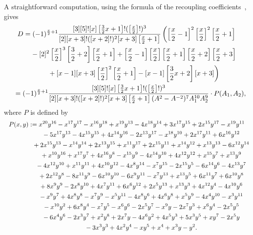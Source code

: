 \documentclass[11pt]{article}
\numberwithin{equation}{section}
\begin{document}
A straightforward computation, using the formula of the recoupling coefficients~\cite{MV}, gives
\begin{gather*}
D = (-1)^{\frac{x}{2}+1}\frac{[3][5]![x] \left[\frac{3}{2}x+1 \right]!(\left[\frac{x}{2}\right]!)^3}{[2][x+3]!([x+2]!)^2[x+3] \left[\frac{x}{2}+1\right]}
\left( \left[\frac{x}{2}-1\right]^2 \left[\frac{x}{2}\right]^2\left[\frac{x}{2}+1\right] \right.\\
\hphantom{D =}{} - [2]^2\left[\frac{x}{2}\right]^3\left[\frac{3}{2}+2\right] \left[\frac{x}{2}+1\right] + \left[\frac{x}{2}-1\right]\left[\frac{x}{2}\right] \left[\frac{x}{2}+1\right] \left[\frac{x}{2}+2\right] \left[\frac{x}{2}+3\right]\\
\left.\hphantom{D =}{} + [x-1][x+3] \left[\frac{x}{2}\right]^2\left[\frac{x}{2}+1\right] - [x-1]\left[\frac{3}{2}x+2\right][x+3] \right) \\
\hphantom{D}{} = (-1)^{\frac{x}{2}+1}\frac{[3][5]![x]\left[\frac{3}{2}x+1\right]!(\left[\frac{x}{2}\right]!)^3}{[2][x+3]!([x+2]!)^2[x+3]\left[\frac{x}{2}+1\right](A^2-A^{-2})^7A_1^{10}A_2^{9}}\cdot P(A_1,A_2),
\end{gather*}
where $P$ is defined by
\begin{gather*}
P(x,y):= x^{20}y^{16}-x^{17}y^{17}-x^{16}y^{18}+x^{19}y^{13}-4x^{18}y^{14}+3x^{17}y^{15}+2x^{15}y^{17}-x^{19}y^{11}\\
\hphantom{P(x,y):=}{} -5x^{17}y^{13}-4x^{15}y^{15}+4x^{14}y^{16}-2x^{13}y^{17}-x^{18}y^{10} +2x^{17}y^{11}+6x^{16}y^{12} \\
\hphantom{P(x,y):=}{}+2x^{15}y^{13}-x^{14}y^{14}+2x^{13}y^{15}+x^{11}y^{17}+2x^{15}y^{11} +x^{14}y^{12}+x^{13}y^{13}-6x^{12}y^{14} \\
\hphantom{P(x,y):=}{}+x^{10}y^{16}+x^{17}y^7+4x^{16}y^8-x^{15}y^9-4x^{14}y^{10}+4x^{12}y^{12}+x^{15}y^7+x^{13}y^9 \\
\hphantom{P(x,y):=}{}-4x^{12}y^{10}+x^{11}y^{11}+4x^{10}y^{12}-4x^8y^{14}-x^7y^{15}-2x^{15}y^5-6x^{14}y^6-4x^{13}y^7 \\
\hphantom{P(x,y):=}{}+2x^{12}y^8 -8x^{11}y^9-6x^{10}y^{10}-6x^9y^{11}-x^7y^{13} +x^{13}y^5+6x^{11}y^7+6x^{10}y^8 \\
\hphantom{P(x,y):=}{}+8x^9y^9-2x^8y^{10}+4x^7y^{11}+6x^6y^{12}+2x^5y^{13}+x^{13}y^3+4x^{12}y^4 -4x^{10}y^6 \\
\hphantom{P(x,y):=}{}-x^9y^7+4x^8y^8 -x^7y^9-x^5y^{11}-4x^8y^6+4x^6y^8+x^5y^9-4x^4y^{10}-x^3y^{11} \\
\hphantom{P(x,y):=}{}-x^{10}y^2+6x^8y^4-x^7y^5-x^6y^6-2x^5y^7-x^9y-2x^7y^3 +x^6y^4-2x^5y^5\\
\hphantom{P(x,y):=}{}-6x^4y^6-2x^3y^7+x^2y^8+2x^7y-4x^6y^2+4x^5y^3+5x^3y^5+xy^7-2x^5y\\
\hphantom{P(x,y):=}{}-3x^3y^3+4x^2y^4-xy^5+x^4+x^3y-y^2.
\end{gather*}
\end{document}
